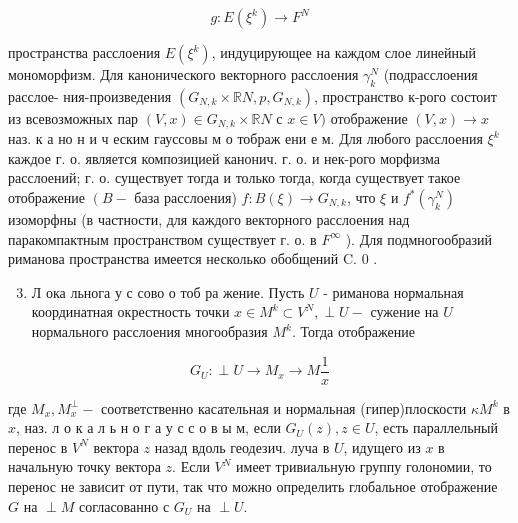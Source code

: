 \documentclass[10pt]{article}
\begin{document}
\[

g: E\left(\xi^{k}\right) \longrightarrow F^{N}

\]



пространства расслоения $E\left(\xi^{k}\right)$, индуцирующее на каждом слое линейный мономорфизм. Для канонического векторного расслоения $\gamma_{k}^{N}$ (подрасслоения расслое- ния-произведения $\left(G_{N, k} \times \mathbb{R} N, p, G_{N, k}\right)$, пространство к-рого состоит из всевозможных пар $(V, x) \in G_{N, k} \times \mathbb{R} N$ с $x \in V)$ отображение $(V, x) \rightarrow x$ наз. к а но н и ч еским гауссовы м о тображ ени е м. Для любого расслоения $\xi^{k}$ каждое г. о. является композицией канонич. г. о. и нек-рого морфизма расслоений; г. о. существует тогда и только тогда, когда существует такое отображение $\left(B-\right.$ база расслоения) $f: B(\xi) \rightarrow G_{N, k}$, что $\xi$ и $f^{*}\left(\gamma_{k}^{N}\right)$ изоморфны (в частности, для каждого векторного расслоения над паракомпактным пространством существует г. о. в $F^{\infty}$ ). Для подмногообразий риманова пространства имеется несколько обобщений C. 0 .



\begin{enumerate}

  \setcounter{enumi}{2}

  \item Л ока льнога у с сово о тоб ра жение. Пусть $U$ - риманова нормальная координатная окрестность точки $x \in M^{k} \subset V^{N}, \perp U-$ сужение на $U$ нормального расслоения многообразия $M^{k}$. Тогда отображение

\end{enumerate}



\[

G_{U}: \perp U \rightarrow M_{x} \rightarrow M \frac{1}{x}

\]



где $M_{x}, M_{x}^{\perp}-$ соответственно касательная и нормальная (гипер)плоскости $\kappa M^{k}$ в $x$, наз. л о к а л ь н о г а у с с о в ы м, если $G_{U}(z), z \in U$, есть параллельный перенос в $V^{N}$ вектора $z$ назад вдоль геодезич. луча в $U$, идущего из $x$ в начальную точку вектора $z$. Если $V^{N}$ имеет тривиальную группу голономии, то перенос не зависит от пути, так что можно определить глобальное отображение $G$ на $\perp M$ согласованно с $G_{U}$ на $\perp U$.
\end{document}
